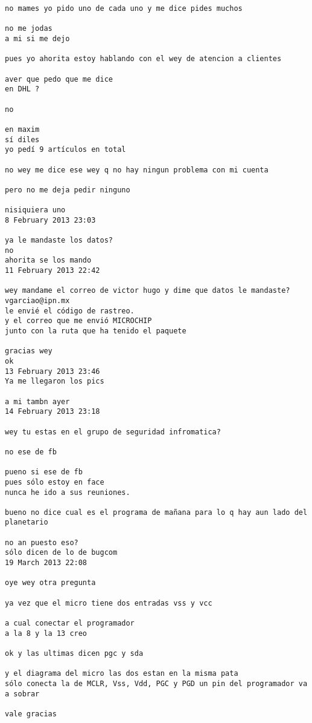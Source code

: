 \begin{verbatim}
no mames yo pido uno de cada uno y me dice pides muchos

no me jodas
a mi si me dejo

pues yo ahorita estoy hablando con el wey de atencion a clientes

aver que pedo que me dice
en DHL ?

no

en maxim
sí diles
yo pedí 9 artículos en total

no wey me dice ese wey q no hay ningun problema con mi cuenta

pero no me deja pedir ninguno

nisiquiera uno
8 February 2013 23:03

ya le mandaste los datos?
no
ahorita se los mando
11 February 2013 22:42

wey mandame el correo de victor hugo y dime que datos le mandaste?
vgarciao@ipn.mx
le envié el código de rastreo.
y el correo que me envió MICROCHIP
junto con la ruta que ha tenido el paquete

gracias wey
ok
13 February 2013 23:46
Ya me llegaron los pics

a mi tambn ayer
14 February 2013 23:18

wey tu estas en el grupo de seguridad infromatica?

no ese de fb

pueno si ese de fb
pues sólo estoy en face
nunca he ido a sus reuniones.

bueno no dice cual es el programa de mañana para lo q hay aun lado del planetario

no an puesto eso?
sólo dicen de lo de bugcom
19 March 2013 22:08

oye wey otra pregunta

ya vez que el micro tiene dos entradas vss y vcc

a cual conectar el programador
a la 8 y la 13 creo

ok y las ultimas dicen pgc y sda

y el diagrama del micro las dos estan en la misma pata
sólo conecta la de MCLR, Vss, Vdd, PGC y PGD un pin del programador va a sobrar

vale gracias
\end{verbatim}